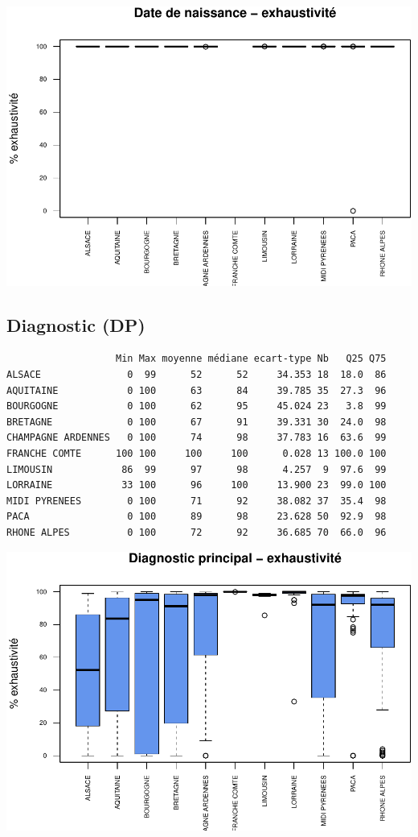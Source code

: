 \documentclass[]{article}
\begin{document}
\includegraphics{septembre2015_files/figure-latex/unnamed-chunk-32-1.pdf}

\subsection{Diagnostic (DP)}\label{diagnostic-dp-2}

\begin{verbatim}
                   Min Max moyenne médiane ecart-type Nb   Q25 Q75
ALSACE               0  99      52      52     34.353 18  18.0  86
AQUITAINE            0 100      63      84     39.785 35  27.3  96
BOURGOGNE            0 100      62      95     45.024 23   3.8  99
BRETAGNE             0 100      67      91     39.331 30  24.0  98
CHAMPAGNE ARDENNES   0 100      74      98     37.783 16  63.6  99
FRANCHE COMTE      100 100     100     100      0.028 13 100.0 100
LIMOUSIN            86  99      97      98      4.257  9  97.6  99
LORRAINE            33 100      96     100     13.900 23  99.0 100
MIDI PYRENEES        0 100      71      92     38.082 37  35.4  98
PACA                 0 100      89      98     23.628 50  92.9  98
RHONE ALPES          0 100      72      92     36.685 70  66.0  96
\end{verbatim}

\includegraphics{septembre2015_files/figure-latex/unnamed-chunk-33-1.pdf}
\end{document}
